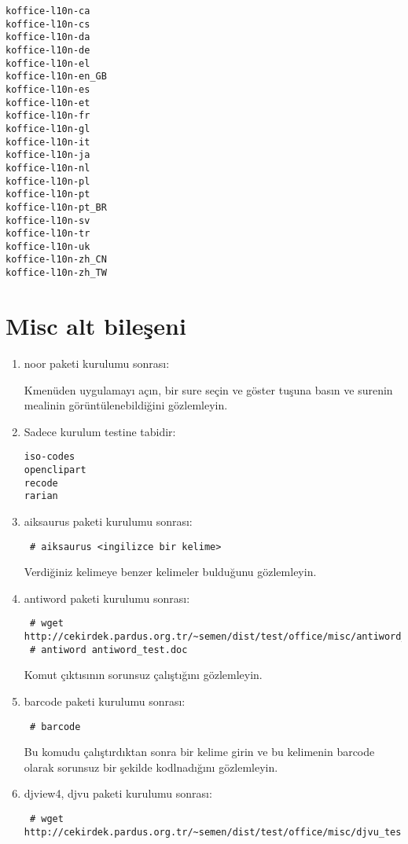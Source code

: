 \documentclass[a4paper,10pt]{article}
\begin{document}
\begin{verbatim}
koffice-l10n-ca
koffice-l10n-cs
koffice-l10n-da
koffice-l10n-de
koffice-l10n-el
koffice-l10n-en_GB
koffice-l10n-es
koffice-l10n-et
koffice-l10n-fr
koffice-l10n-gl
koffice-l10n-it
koffice-l10n-ja
koffice-l10n-nl
koffice-l10n-pl
koffice-l10n-pt
koffice-l10n-pt_BR
koffice-l10n-sv
koffice-l10n-tr
koffice-l10n-uk
koffice-l10n-zh_CN
koffice-l10n-zh_TW
\end{verbatim}

\section{Misc alt bileşeni}
\begin{enumerate}
\item noor paketi kurulumu sonrası:

Kmenüden uygulamayı açın, bir sure seçin ve göster tuşuna basın ve surenin mealinin görüntülenebildiğini gözlemleyin.
\item Sadece kurulum testine tabidir:
\begin{verbatim}
iso-codes
openclipart
recode
rarian
\end{verbatim}
\item aiksaurus paketi kurulumu sonrası:
\begin{verbatim}
 # aiksaurus <ingilizce bir kelime>
\end{verbatim}

Verdiğiniz kelimeye benzer kelimeler bulduğunu gözlemleyin.

\item antiword paketi kurulumu sonrası:
\begin{verbatim}
 # wget http://cekirdek.pardus.org.tr/~semen/dist/test/office/misc/antiword_test.doc
 # antiword antiword_test.doc
\end{verbatim}

Komut çıktısının sorunsuz çalıştığını gözlemleyin.

\item barcode paketi kurulumu sonrası:
\begin{verbatim}
 # barcode
\end{verbatim}
 Bu komudu çalıştırdıktan sonra bir kelime girin ve bu kelimenin barcode olarak sorunsuz bir şekilde kodlnadığını gözlemleyin.

\item djview4, djvu paketi kurulumu sonrası:
\begin{verbatim}
 # wget http://cekirdek.pardus.org.tr/~semen/dist/test/office/misc/djvu_test.djvu
\end{verbatim}


\end{enumerate}
\end{document}
